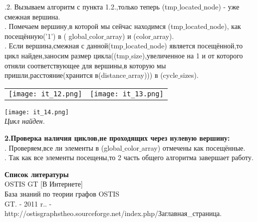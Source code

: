 \documentclass[a4paper,11pt]{article}
\begin{document}
\begin{flushleft}
\quad {}.2. Вызываем алгоритм с пункта 1.2.,только теперь (tmp$\_$located$\_$node) - уже смежная вершина. \\
. Помечаем вершину,в которой мы сейчас находимся (tmp$\_$located$\_$node), как посещённую('1') в ( global$\_$color$\_$array) и (color$\_$array). \\
. Если вершина,смежная с данной(tmp$\_$located$\_$node) является посещённой,то цикл найден,заносим размер цикла((tmp$\_$size),увеличенное на 1 и от которого отняли соответствующее для вершины,в которую мы пришли,расстояние(хранится в(distance$\_$array))) в (cycle$\_$sizes). \\
\end{flushleft}
\begin{tabulary}{\linewidth}{}
  \texttt{[image: it\_12.png]} 
  &
  \texttt{[image: it\_13.png]}
   \\                                                     
\end{tabulary}
\texttt{[image: it\_14.png]} \\ \textit{Цикл найден.}
\begin{flushleft}
\Large{\textbf{2.Проверка наличия циклов,не проходящих через нулевую вершину:}}\\
. Проверяем,все ли элементы в (global$\_$color$\_$array) отмечены как посещённые. \\
. Так как все элементы посещены,то 2 часть общего алгоритма завершает работу.
\end{flushleft}
\textbf{Список литературы} \\
OSTIS GT [В Интернете] \\ База знаний по теории графов OSTIS \\
GT. - 2011 r.. - \\
http://ostisgraphstheo.sourceforge.net/index.php/Заглавная\_страница.
\end{document}
